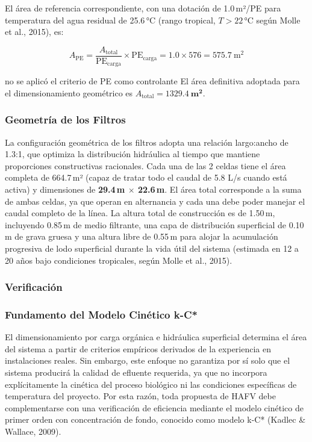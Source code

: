 \documentclass[12pt,a4paper]{article}
\begin{document}
El área de referencia correspondiente, con una dotación de 1.0\,m²/PE para temperatura del agua residual de 25.6\,°C (rango tropical, $T > 22$\,°C según Molle et al., 2015), es:

\begin{equation}
A_\text{PE} = \frac{A_\text{total}}{\text{PE}_\text{carga}} \times \text{PE}_\text{carga} = 1.0 \times 576 = 575.7\ \text{m}^2
\end{equation}

no se aplicó el criterio de PE como controlante El área definitiva adoptada para el dimensionamiento geométrico es $A_\text{total} = \mathbf{1329.4\ \text{m}^2}$.

\subsubsection*{Geometría de los Filtros}

La configuración geométrica de los filtros adopta una relación largo:ancho de 1.3:1, que optimiza la distribución hidráulica al tiempo que mantiene proporciones constructivas racionales. Cada una de las 2 celdas tiene el área completa de 664.7\,m² (capaz de tratar todo el caudal de 5.8 L/s cuando está activa) y dimensiones de \textbf{29.4\,m $\times$ 22.6\,m}. El área total corresponde a la suma de ambas celdas, ya que operan en alternancia y cada una debe poder manejar el caudal completo de la línea. La altura total de construcción es de 1.50\,m, incluyendo 0.85\,m de medio filtrante, una capa de distribución superficial de 0.10\,m de grava gruesa y una altura libre de 0.55\,m para alojar la acumulación progresiva de lodo superficial durante la vida útil del sistema (estimada en 12 a 20 años bajo condiciones tropicales, según Molle et al., 2015).


\subsubsection{Verificación}

\subsubsection*{Fundamento del Modelo Cinético k-C*}

El dimensionamiento por carga orgánica e hidráulica superficial determina el área del sistema a partir de criterios empíricos derivados de la experiencia en instalaciones reales. Sin embargo, este enfoque no garantiza por sí solo que el sistema producirá la calidad de efluente requerida, ya que no incorpora explícitamente la cinética del proceso biológico ni las condiciones específicas de temperatura del proyecto. Por esta razón, toda propuesta de HAFV debe complementarse con una verificación de eficiencia mediante el modelo cinético de primer orden con concentración de fondo, conocido como modelo k-C* (Kadlec \& Wallace, 2009).
\end{document}
